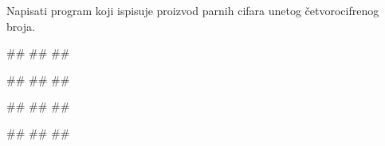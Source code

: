 \begin{Exercise}[label=p1.2_04] 
Napisati program koji ispisuje proizvod parnih cifara unetog četvorocifrenog broja. 

\begin{miditest}
\begin{upotreba}{1}
#\naslovInt#
##
##
\end{upotreba}
\end{miditest}
\begin{miditest}
\begin{upotreba}{2}
#\naslovInt#
##
##
\end{upotreba}
\end{miditest}

\begin{miditest}
\begin{upotreba}{3}
#\naslovInt#
##
##
\end{upotreba}
\end{miditest}
\begin{miditest}
\begin{upotreba}{4}
#\naslovInt#
##
##
\end{upotreba}
\end{miditest}


\end{Exercise}
\ifresenja
 \begin{Answer}[ref=p1.2_04]
\end{Answer}
\fi







